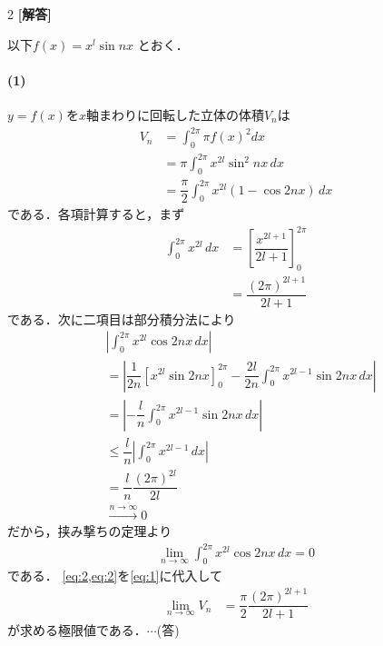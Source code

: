 \documentclass[../../main.tex]{subfiles}
\begin{document}
\setcounter{equation}{0}
\begin{oframed}
  
\end{oframed}
\setlength{\columnseprule}{0.4pt}
\begin{multicols}{2}
  {\bf [解答]}

  以下$f(x) = x^l \sin nx$ とおく．

  \paragraph{(1)}
  $y=f(x)$を$x$軸まわりに回転した立体の体積$V_n$は
  \begin{align}
    V_n
    & = \int_0^{2\pi} \pi f(x)^2 dx                                                 \\
    & = \pi \int_0^{2\pi} x^{2l} \sin^2 nx \, dx                                    \\
    & = \dfrac{\pi}{2} \int_0^{2\pi} x^{2l} (1 - \cos 2nx) \, dx \label{eq:1}
  \end{align}
  である．各項計算すると，まず
  \begin{align}
    \int_0^{2\pi} x^{2l} \, dx
    & = \left[ \dfrac{x^{2l+1}}{2l+1} \right]_0^{2\pi}  \\
    & = \dfrac{(2\pi)^{2l+1}}{2l+1} \label{eq:2}
  \end{align}
  である．次に二項目は部分積分法により
  \begin{align}
    & \left|\int_0^{2\pi} x^{2l} \cos 2nx \, dx\right|                                                                          \\
    & = \left|\dfrac{1}{2n} \left[ x^{2l} \sin 2nx \right]_0^{2\pi} - \dfrac{2l}{2n} \int_0^{2\pi} x^{2l-1} \sin 2nx \, dx\right| \\
    & = \left| - \dfrac{l}{n} \int_0^{2\pi} x^{2l-1} \sin 2nx \, dx  \right|                                                     \\
    & \le   \dfrac{l}{n} \left|\int_0^{2\pi} x^{2l-1} \, dx \right|                                                              \\
    & =  \dfrac{l}{n}  \dfrac{(2\pi)^{2l}}{2l}                                                                                    \\
    & \xrightarrow{n \to \infty} 0
  \end{align}
  だから，挟み撃ちの定理より
  \begin{align}
    \lim_{n\to\infty} \int_0^{2\pi} x^{2l} \cos 2nx \, dx = 0 \label{eq:3}
  \end{align}
  である．
  \cref{eq:2,eq:2}を\cref{eq:1}に代入して
  \begin{align}
    \lim_{n\to\infty}V_n
    & = \dfrac{\pi}{2} \dfrac{(2\pi)^{2l+1}}{2l+1}
  \end{align}
  が求める極限値である．$\cdots$(答)


\end{multicols}
\end{document}
